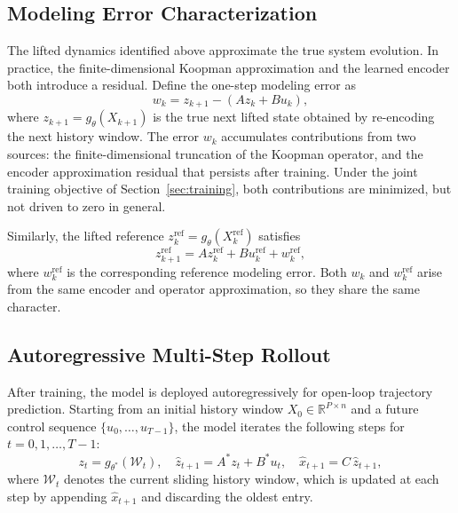 \documentclass[journal]{IEEEtran}
\begin{document}
\subsection{Modeling Error Characterization}
\label{subsec:modeling_error}

The lifted dynamics identified above approximate the true system evolution. In practice, the finite-dimensional Koopman approximation and the learned encoder both introduce a residual. Define the one-step modeling error as
\begin{equation}
    w_k = z_{k+1} - (Az_k + Bu_k),
    \label{eq:modeling_error}
\end{equation}
where $z_{k+1} = g_\theta(X_{k+1})$ is the true next lifted state obtained by re-encoding the next history window. The error $w_k$ accumulates contributions from two sources: the finite-dimensional truncation of the Koopman operator, and the encoder approximation residual that persists after training. Under the joint training objective of Section~\ref{sec:training}, both contributions are minimized, but not driven to zero in general.

Similarly, the lifted reference $z_k^{\mathrm{ref}} = g_\theta(X_k^{\mathrm{ref}})$ satisfies
\begin{equation}
    z_{k+1}^{\mathrm{ref}} = Az_k^{\mathrm{ref}} + Bu_k^{\mathrm{ref}} + w_k^{\mathrm{ref}},
    \label{eq:ref_error}
\end{equation}
where $w_k^{\mathrm{ref}}$ is the corresponding reference modeling error. Both $w_k$ and $w_k^{\mathrm{ref}}$ arise from the same encoder and operator approximation, so they share the same character.


\subsection{Autoregressive Multi-Step Rollout}
\label{sec:rollout}

After training, the model is deployed autoregressively for open-loop trajectory prediction. Starting from an initial history window $X_0 \in \mathbb{R}^{P \times n}$ and a future control sequence $\{u_0,\ldots,u_{T-1}\}$, the model iterates the following steps for $t=0,1,\ldots,T-1$:
\begin{equation}
    z_t = g_{\theta^*}(\mathcal{W}_t), \quad
    \hat{z}_{t+1} = A^* z_t + B^* u_t, \quad
    \hat{x}_{t+1} = C\,\hat{z}_{t+1},
    \label{eq:rollout_step}
\end{equation}
where $\mathcal{W}_t$ denotes the current sliding history window, which is updated at each step by appending $\hat{x}_{t+1}$ and discarding the oldest entry.
\end{document}
